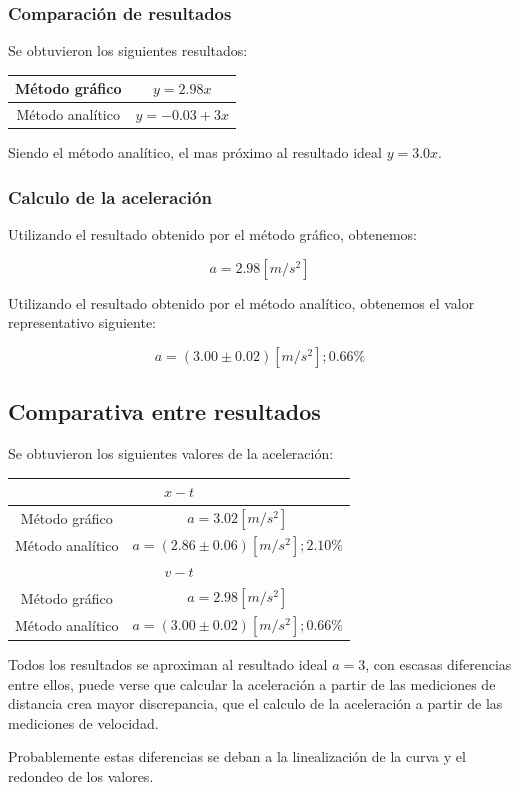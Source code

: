 \documentclass[letter,11pt]{article}
\begin{document}
\subsubsection{Comparación de resultados}
Se obtuvieron los siguientes resultados:

\begin{center}
\begin{tabular}{|c|c|}
\hline
Método gráfico & $y = 2.98 x$ \\
\hline
Método analítico & $y = -0.03 + 3 x$ \\
\hline
\end{tabular}
\end{center}

Siendo el método analítico, el mas próximo al resultado ideal $y = 3.0 x$.

\subsubsection{Calculo de la aceleración}
Utilizando el resultado obtenido por el método gráfico, obtenemos:

\begin{equation}
    a = 2.98 [m/s^2]
\end{equation}

Utilizando el resultado obtenido por el método analítico, obtenemos el valor
representativo siguiente:

\begin{equation}
    a = (3.00 \pm 0.02)[m/s^2];0.66\%
\end{equation}

\subsection{Comparativa entre resultados}
Se obtuvieron los siguientes valores de la aceleración:

\begin{center}
\begin{tabular}{|c|c|}
\hline
\multicolumn{2}{|c|}{$x-t$} \\
\hline
Método gráfico & $a = 3.02 [m/s^2]$ \\
\hline
Método analítico & $a = (2.86 \pm 0.06)[m/s^2];2.10\%$ \\
\hline
\multicolumn{2}{|c|}{$v-t$} \\
\hline
Método gráfico & $a = 2.98 [m/s^2]$ \\
\hline
Método analítico & $a = (3.00 \pm 0.02)[m/s^2];0.66\%$ \\
\hline
\end{tabular}
\end{center}

Todos los resultados se aproximan al resultado ideal $a = 3$, con escasas
diferencias entre ellos, puede verse que calcular la aceleración a partir de las
mediciones de distancia crea mayor discrepancia, que el calculo de la
aceleración a partir de las mediciones de velocidad.

Probablemente estas diferencias se deban a la linealización de la curva y el
redondeo de los valores.
\end{document}
